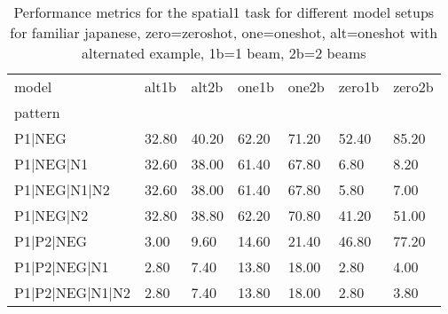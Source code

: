 \begin{table}[h]
\begin{tabular}{l|llllll}
\toprule
model & alt1b & alt2b & one1b & one2b & zero1b & zero2b \\
pattern &  &  &  &  &  &  \\
\midrule
P1|NEG & 32.80 & 40.20 & 62.20 & 71.20 & 52.40 & 85.20 \\
P1|NEG|N1 & 32.60 & 38.00 & 61.40 & 67.80 & 6.80 & 8.20 \\
P1|NEG|N1|N2 & 32.60 & 38.00 & 61.40 & 67.80 & 5.80 & 7.00 \\
P1|NEG|N2 & 32.80 & 38.80 & 62.20 & 70.80 & 41.20 & 51.00 \\
P1|P2|NEG & 3.00 & 9.60 & 14.60 & 21.40 & 46.80 & 77.20 \\
P1|P2|NEG|N1 & 2.80 & 7.40 & 13.80 & 18.00 & 2.80 & 4.00 \\
P1|P2|NEG|N1|N2 & 2.80 & 7.40 & 13.80 & 18.00 & 2.80 & 3.80 \\
\bottomrule
\end{tabular}
\caption{Performance metrics for the spatial1 task for different model setups for familiar japanese, zero=zeroshot, one=oneshot, alt=oneshot with alternated example, 1b=1 beam, 2b=2 beams}
\label{tab:ja fam_spatial1_performance}
\end{table}
